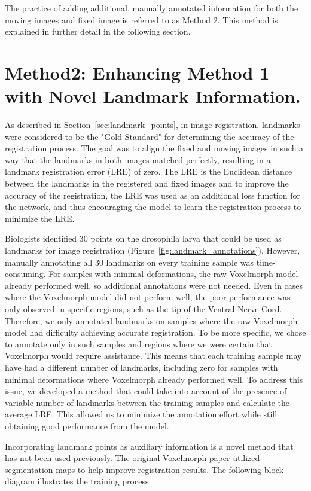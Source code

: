 \documentclass{report}
\begin{document}
	The practice of adding additional, manually annotated information for both the moving images and fixed image is referred to as Method 2. This method is explained in further detail in the following section.
	
	\section{Method2: Enhancing Method 1 with Novel Landmark Information.}
	As described in Section~\ref{sec:landmark_points}, in image registration, landmarks were considered to be the "Gold Standard" for determining the accuracy of the registration process. The goal was to align the fixed and moving images in such a way that the landmarks in both images matched perfectly, resulting in a landmark registration error (LRE) of zero. The LRE is the Euclidean distance between the landmarks in the registered and fixed images and to improve the accuracy of the registration, the LRE was used as an additional loss function for the network, and thus encouraging the model to learn the registration process to minimize the LRE.
	
	Biologists identified 30 points on the drosophila larva that could be used as landmarks for image registration (Figure~\ref{fig:landmark_annotations}). However, manually annotating all 30 landmarks on every training sample was time-consuming. For samples with minimal deformations, the raw Voxelmorph model already performed well, so additional annotations were not needed. Even in cases where the Voxelmorph model did not perform well, the poor performance was only observed in specific regions, such as the tip of the Ventral Nerve Cord. Therefore, we only annotated landmarks on samples where the raw Voxelmorph model had difficulty achieving accurate registration. To be more specific, we chose to annotate only in such samples and regions where we were certain that Voxelmorph would require assistance. This means that each training sample may have had a different number of landmarks, including zero for samples with minimal deformations where Voxelmorph already performed well. To address this issue, we developed a method that could take into account of the presence of variable number of landmarks between the training samples and calculate the average LRE. This allowed us to minimize the annotation effort while still obtaining good performance from the model.
	
	Incorporating landmark points as auxiliary information is a novel method that has not been used previously. The original Voxelmorph paper utilized segmentation maps to help improve registration results. The following block diagram illustrates the training process.
	
\end{document}
